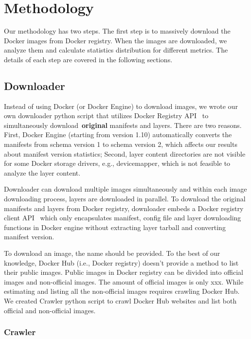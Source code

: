 
\section{Methodology}

Our methodology has two steps. The first step is to massively download the Docker images from Docker registry. When the images are downloaded, we analyze them and calculate statistics distribution for different metrics. The details of each step are covered in the following sections.

\subsection{Downloader}

Instead of using Docker (or Docker Engine) to download images, we wrote our own downloader python script that utilizes Docker Registry API~\cite{} to simultaneously download~\textbf{original} manifests and layers. There are two reasons. First, Docker Engine (starting from version 1.10) automatically converts the manifests from schema version 1 to schema version 2, which affects our results about manifest version statistics; Second, layer content directories are not visible for some Docker storage drivers, e.g., devicemapper, which is not feasible to analyze the layer content. 

Downloader can download multiple images simultaneously and within each image downloading process, layers are downloaded in parallel. To download the original manifests and layers from Docker registry, downloader embeds a Docker registry client API~\cite{xxx} which only encapsulates manifest, config file and layer downloading functions in Docker engine without extracting layer tarball and converting manifest version. 

To download an image, the name should be provided. To the best of our knowledge, Docker Hub (i.e., Docker registry) doesn't provide a method to list their public images. Public images in Docker registry can be divided into official images and non-official images. The amount of official images is only xxx. While estimating and listing all the non-official images requires crawling Docker Hub. We created Crawler python script to crawl Docker Hub websites and list both official and non-official images.

\subsubsection{Crawler}


